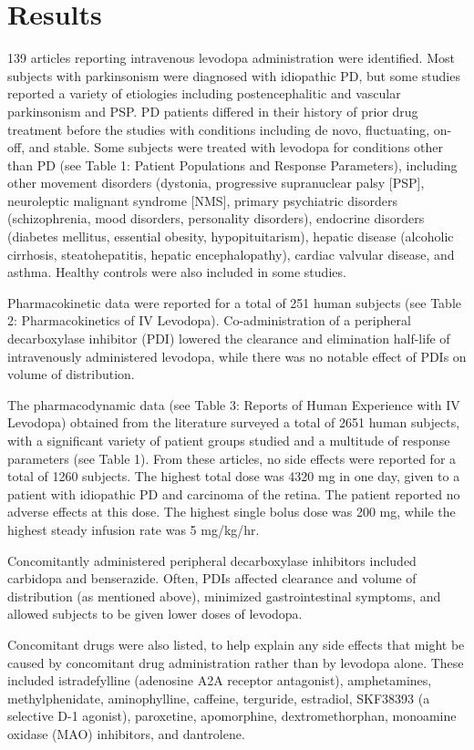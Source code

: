 \section{Results}
139 articles reporting intravenous levodopa administration were identified.  Most subjects with parkinsonism were diagnosed with idiopathic PD, but some studies reported a variety of etiologies including postencephalitic and vascular parkinsonism and PSP.  PD patients differed in their history of prior drug treatment before the studies with conditions including de novo, fluctuating, on-off, and stable.  Some subjects were treated with levodopa for conditions other than PD (see Table 1: Patient Populations and Response Parameters), including other movement disorders (dystonia, progressive supranuclear palsy [PSP], neuroleptic malignant syndrome [NMS], primary psychiatric disorders (schizophrenia, mood disorders, personality disorders),  endocrine disorders (diabetes mellitus, essential obesity, hypopituitarism), hepatic disease (alcoholic cirrhosis, steatohepatitis, hepatic encephalopathy), cardiac valvular disease, and asthma.  Healthy controls were also included in some studies.

Pharmacokinetic data were reported for a total of 251 human subjects (see Table 2: Pharmacokinetics of IV Levodopa).  Co-administration of a peripheral decarboxylase inhibitor (PDI) lowered the clearance and elimination half-life of intravenously administered levodopa, while there was no notable effect of PDIs on volume of distribution.

The pharmacodynamic data (see Table 3: Reports of Human Experience with IV Levodopa) obtained from the literature  surveyed a total of 2651 human subjects, with a significant variety of patient groups studied and a multitude of response parameters (see Table 1).  From these articles, no side effects were reported for a total of 1260 subjects.  The highest total dose was 4320 mg in one day, given to a patient with idiopathic PD and carcinoma of the retina.  The patient reported no adverse effects at this dose.  The highest single bolus dose was 200 mg, while the highest steady infusion rate was 5 mg/kg/hr.

Concomitantly administered peripheral decarboxylase inhibitors included carbidopa and benserazide.  Often, PDIs affected clearance and volume of distribution (as mentioned above), minimized gastrointestinal symptoms, and allowed subjects to be given lower doses of levodopa.    

Concomitant drugs were also listed, to help explain any side effects that might be caused by concomitant drug administration rather than by levodopa alone.  These included istradefylline (adenosine A2A receptor antagonist), amphetamines, methylphenidate, aminophylline, caffeine, terguride, estradiol, SKF38393 (a selective D-1 agonist), paroxetine, apomorphine, dextromethorphan, monoamine oxidase (MAO) inhibitors, and dantrolene.  

